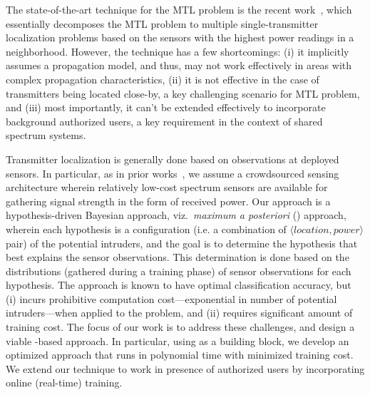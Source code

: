 The state-of-the-art technique for the MTL problem is the recent
work~\cite{mobicom17-splot}, which essentially decomposes the MTL
problem to multiple single-transmitter localization problems based on
the sensors with the highest power readings in a
neighborhood.  However, the technique has
a few shortcomings: (i) it implicitly assumes a propagation model, and
thus, may not work effectively in areas with complex propagation
characteristics, (ii) it is not effective in the case of transmitters
being located close-by, a key challenging scenario for MTL problem,
and (iii) most importantly, it can't be extended effectively to
incorporate background authorized users, a key requirement in the
context of shared spectrum systems. 

  Transmitter localization is generally done based
on observations at deployed sensors. In particular, as in prior
works~\cite{mobicom17-splot,chakraborty2017specsense}, we assume a
crowdsourced sensing architecture wherein relatively low-cost spectrum
sensors are available for gathering signal strength in the form of
received power. Our approach is a hypothesis-driven Bayesian approach,
viz.\ {\em maximum a posteriori} (\map) approach, wherein each
hypothesis is a configuration (i.e.  a combination of $\langle
location, power \rangle$ pair) of the potential intruders, and the
goal is to determine the hypothesis that best explains the sensor
observations. This determination is done based on the distributions
(gathered during a training phase) of sensor observations for each
hypothesis.
The \map approach is known to have optimal classification accuracy,
but (i) incurs prohibitive computation cost---exponential in number of
potential intruders---when applied to the \mtl problem, and (ii)
requires significant amount of training cost. The focus of our work is
to address these challenges, and design a viable \map-based approach.
In particular, using \map as a building block, we develop an optimized
approach that runs in polynomial time with minimized training cost.
We extend our technique to work in presence of authorized users by
incorporating online (real-time) training.


